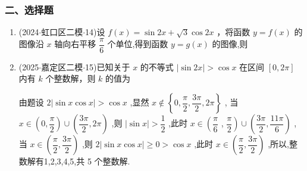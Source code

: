\subsubsection*{二、选择题}
\begin{enumerate}
    \item (2024$\cdot$虹口区二模$\cdot$14)设 $f\left( x\right)  = \sin {2x} + \sqrt{3}\cos {2x}$ ，将函数 $y = f\left( x\right)$ 的图像沿 $x$ 轴向右平移 $\dfrac{\pi }{6}$ 个单位,得到函数 $y = g\left( x\right)$ 的图像,则 
    \item (2025$\cdot$嘉定区二模$\cdot$15)已知关于 $x$ 的不等式 $\left| {\sin {2x}}\right|  > \cos x$ 在区间 $\left\lbrack  {0,{2\pi }}\right\rbrack$ 内有 $k$ 个整数解，则 $k$ 的值为 
    \begin{jieda}
        由题设 $2\left| {\sin x\cos x}\right|  > \cos x$ ,显然 $x \notin  \left\{  {0,\dfrac{\pi }{2},\dfrac{3\pi }{2},{2\pi }}\right\}$ , 当 $x \in  \left( {0,\dfrac{\pi }{2}}\right)  \cup  \left( {\dfrac{3\pi }{2},{2\pi }}\right)$ ,则 $\left| {\sin x}\right|  > \dfrac{1}{2}$ ,此时 $x \in  \left( \dfrac{\pi }{6}\right.$ , $\left. \dfrac{\pi }{2}\right)  \cup  \left( {\dfrac{3\pi }{2},\dfrac{11\pi }{6}}\right)$ ,当 $x \in  \left( {\dfrac{\pi }{2},\dfrac{3\pi }{2}}\right)$ ,则 $2\left| {\sin x\cos x}\right|  \geq  0 >  \cos x$ ,此时 $x \in  \left( {\dfrac{\pi }{2},\dfrac{3\pi }{2}}\right)$ ,所以,整数解有1,2,3,4,5,共 5 个整数解.


\end{jieda}
\end{enumerate}
